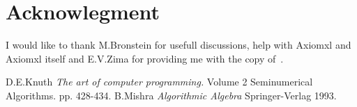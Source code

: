 \documentclass[12pt,fullpage]{article}
\begin{document}
\section{Acknowlegment}
I would like to thank M.Bronstein for usefull discussions, help with Axiomxl
and Axiomxl itself and E.V.Zima for providing me with the copy of~\cite{Knuth}.

\begin{thebibliography}{}
D.E.Knuth {\em The art of computer programming.} Volume 2 Seminumerical
Algorithms.
 pp. 428-434.
B.Mishra {\em Algorithmic Algebra} Springer-Verlag 1993.

\end{thebibliography}
\end{document}
